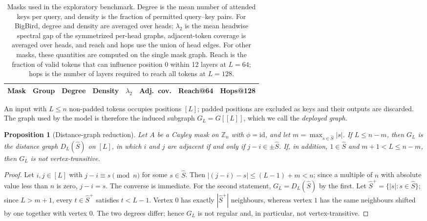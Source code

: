 \documentclass[10pt]{article}
\newtheorem{proposition}{Proposition}
\newcommand{\Z}{\mathbb{Z}}
\begin{document}
\begin{table}[t]
\centering
\caption{Masks used in the exploratory benchmark. Degree is the mean number of attended keys per query, and density is the fraction of permitted query--key pairs. For BigBird, degree and density are averaged over heads; $\lambda_2$ is the mean headwise spectral gap of the symmetrized per-head graphs, adjacent-token coverage is averaged over heads, and reach and hops use the union of head edges. For other masks, these quantities are computed on the single mask graph. Reach is the fraction of valid tokens that can influence position 0 within 12 layers at $L=64$; hops is the number of layers required to reach all tokens at $L=128$.}
\label{tab:masks}
\small
\begin{tabular}{llrrrrrr}
\toprule
Mask & Group & Degree & Density & $\lambda_2$ & Adj.\ cov. & Reach@64 & Hops@128 \\
\midrule

\end{tabular}
\end{table}

An input with $L\le n$ non-padded tokens occupies positions $[L]$; padded positions are excluded as keys and their outputs are discarded. The graph used by the model is therefore the induced subgraph $G_L=G[[L]]$, which we call the \emph{deployed graph}.

\begin{proposition}[Distance-graph reduction]
\label{prop:distance}
Let $A$ be a Cayley mask on $\Z_n$ with $\phi=\mathrm{id}$, and let $m=\max_{s\in\hat S}|s|$. If $L\le n-m$, then $G_L$ is the distance graph $D_L(\hat S)$ on $[L]$, in which $i$ and $j$ are adjacent if and only if $j-i\in\pm\hat S$. If, in addition, $1\in\hat S$ and $m+1<L\le n-m$, then $G_L$ is not vertex-transitive.
\end{proposition}
\begin{proof}
Let $i,j\in[L]$ with $j-i\equiv s\pmod n$ for some $s\in\hat S$. Then $|(j-i)-s|\le(L-1)+m<n$; since a multiple of $n$ with absolute value less than $n$ is zero, $j-i=s$. The converse is immediate. For the second statement, $G_L=D_L(\hat S)$ by the first. Let $\hat S^+=\{|s|:s\in\hat S\}$; since $L>m+1$, every $t\in\hat S^+$ satisfies $t<L-1$. Vertex $0$ has exactly $|\hat S^+|$ neighbours, whereas vertex $1$ has the same neighbours shifted by one together with vertex $0$. The two degrees differ; hence $G_L$ is not regular and, in particular, not vertex-transitive.
\end{proof}
\end{document}
